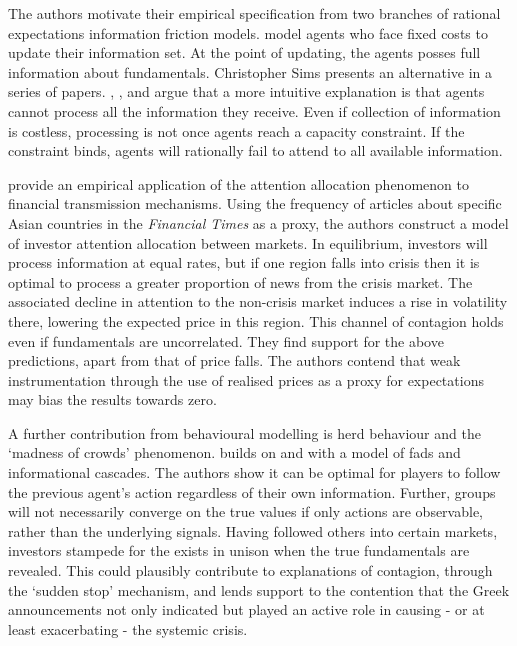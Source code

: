 \documentclass[../base.tex]{subfiles}
\begin{document}
The authors motivate their empirical specification from two branches of rational expectations information friction models. \cite{NBERw8290} model agents who face fixed costs to update their information set. At the point of updating, the agents posses full information about fundamentals. Christopher Sims presents an alternative in a series of papers. \cite{sims1998stickiness}, \cite{sims2003implications}, and \cite{sims2006rational} argue that a more intuitive explanation is that agents cannot process all the information they receive. Even if collection of information is costless, processing is not once agents reach a capacity constraint. If the constraint binds, agents will rationally fail to attend to all available information. 

\cite{mondria2013financial} provide an empirical application of the attention allocation phenomenon to financial transmission mechanisms. Using the frequency of articles about specific Asian countries in the \textit{Financial Times} as a proxy, the authors construct a model of investor attention allocation between markets. In equilibrium, investors will process information at equal rates, but if one region falls into crisis then it is optimal to process a greater proportion of news from the crisis market. The associated decline in attention to the non-crisis market induces a rise in volatility there, lowering the expected price in this region. This channel of contagion holds even if fundamentals are uncorrelated. They find support for the above predictions, apart from that of price falls. The authors contend that weak instrumentation through the use of realised prices as a proxy for expectations may bias the results towards zero. 

A further contribution from behavioural modelling is herd behaviour and the `madness of crowds' phenomenon. \cite{bikhchandani1998learning} builds on \cite{bikhchandani1992theory} and \cite{banerjee1992simple} with a model of fads and informational cascades. The authors show it can be optimal for players to follow the previous agent's action regardless of their own information. Further, groups will not necessarily converge on the true values if only actions are observable, rather than the underlying signals. Having followed others into certain markets, investors stampede for the exists in unison when the true fundamentals are revealed. This could plausibly contribute to explanations of contagion, through the  \cite{kaminsky2003unholy} `sudden stop' mechanism, and lends support to the contention that the Greek announcements not only indicated but played an active role in causing - or at least exacerbating - the systemic crisis.
\end{document}
